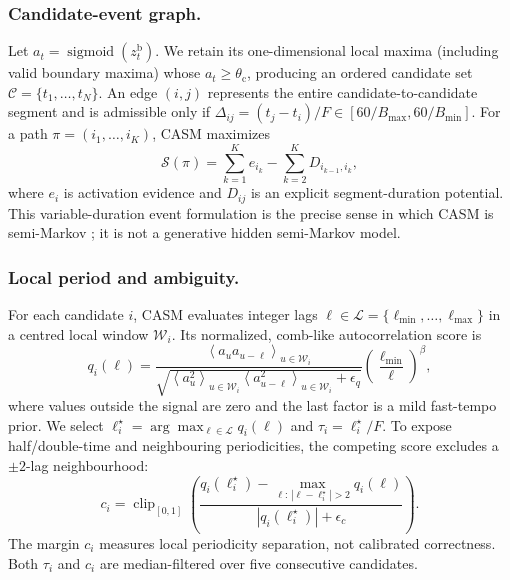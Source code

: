 \documentclass{article}
\begin{document}
\subsubsection{Candidate-event graph.}
Let $a_t=\operatorname{sigmoid}(z_t^{\mathrm b})$.  We retain its
one-dimensional local maxima (including valid boundary maxima) whose
$a_t\geq\theta_{\mathrm c}$, producing an ordered candidate set
$\mathcal C=\{t_1,\ldots,t_N\}$.  An edge $(i,j)$ represents the entire
candidate-to-candidate segment and is admissible only if
$\Delta_{ij}=(t_j-t_i)/F\in[60/B_{\max},60/B_{\min}]$.  For a path
$\pi=(i_1,\ldots,i_K)$, CASM maximizes
\begin{equation}
\mathcal S(\pi)=\sum_{k=1}^{K}e_{i_k}
-\sum_{k=2}^{K}D_{i_{k-1},i_k},
\label{eq:casm-objective}
\end{equation}
where $e_i$ is activation evidence and $D_{ij}$ is an explicit segment-duration
potential.  This variable-duration event formulation is the precise sense in
which CASM is semi-Markov \cite{sarawagi2004semimarkov}; it is not a generative
hidden semi-Markov model.

\subsubsection{Local period and ambiguity.}
For each candidate $i$, CASM evaluates integer lags
$\ell\in\mathcal L=\{\ell_{\min},\ldots,\ell_{\max}\}$ in a centred local
window $\mathcal W_i$.  Its normalized, comb-like autocorrelation score is
\begin{equation}
q_i(\ell)=
\frac{\left\langle a_u a_{u-\ell}\right\rangle_{u\in\mathcal W_i}}
{\sqrt{\left\langle a_u^2\right\rangle_{u\in\mathcal W_i}
       \left\langle a_{u-\ell}^2\right\rangle_{u\in\mathcal W_i}
       +\epsilon_q}}
\left(\frac{\ell_{\min}}{\ell}\right)^{\beta},
\label{eq:casm-local-period}
\end{equation}
where values outside the signal are zero and the last factor is a mild
fast-tempo prior.  We select
$\ell_i^\star=\arg\max_{\ell\in\mathcal L}q_i(\ell)$ and
$\tau_i=\ell_i^\star/F$.  To expose half/double-time and neighbouring
periodicities, the competing score excludes a $\pm2$-lag neighbourhood:
\begin{equation}
c_i=\operatorname{clip}_{[0,1]}\!\left(
\frac{q_i(\ell_i^\star)-
\max_{\ell:\,|\ell-\ell_i^\star|>2}q_i(\ell)}
{|q_i(\ell_i^\star)|+\epsilon_c}\right).
\label{eq:casm-reliability}
\end{equation}
The margin $c_i$ measures local periodicity separation, not calibrated
correctness.  Both $\tau_i$ and $c_i$ are median-filtered over five consecutive
candidates.
\end{document}
